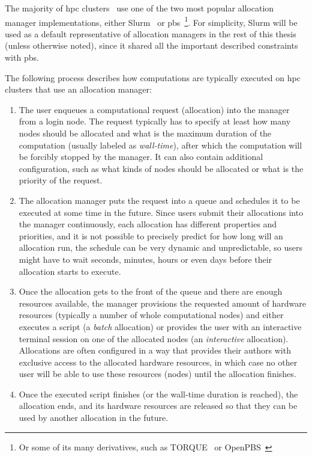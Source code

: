 The majority of \gls{hpc} clusters~\cite{slurm-schedmd} use one of the two
most popular allocation manager implementations, either Slurm~\cite{slurm} or
\gls{pbs}~\cite{pbs}\footnote{Or some of its many derivatives,
such as TORQUE~\cite{torque} or OpenPBS~\cite{openpbs}}. For simplicity,
Slurm will be used as a default representative of allocation managers in the rest of this thesis
(unless otherwise noted), since it shared all the important described constraints with
\gls{pbs}.

The following process describes how computations are typically executed on
\gls{hpc} clusters that use an allocation manager:

\begin{enumerate}
	\item The user enqueues a computational request (allocation) into the manager from a login node. The
	      request typically has to specify at least how many nodes should be allocated and what is the
	      maximum duration of the computation (usually labeled as \emph{wall-time}), after which the
	      computation will be forcibly stopped by the manager. It can also contain additional configuration,
	      such as what kinds of nodes should be allocated or what is the priority of the request.
	\item The allocation manager puts the request into a queue and schedules it to be executed at some time
	      in the future. Since users submit their allocations into the manager continuously, each allocation
	      has different properties and priorities, and it is not possible to precisely predict for how long
	      will an allocation run, the schedule can be very dynamic and unpredictable, so users might have
	  	  to wait seconds, minutes, hours or even days before their allocation starts to execute.
	\item Once the allocation gets to the front of the queue and there are enough resources available, the
	      manager provisions the requested amount of hardware resources (typically a number of whole
	      computational nodes) and either executes a script (a \emph{batch} allocation) or
	      provides the user with an interactive terminal session on one of the allocated nodes (an
	      \emph{interactive} allocation). Allocations are often configured in a way that provides
	      their authors with exclusive access to the allocated hardware resources, in which case no other
	      user will be able to use these resources (nodes) until the allocation finishes.
	\item Once the executed script finishes (or the wall-time duration is reached), the allocation ends, and
	      its hardware resources are released so that they can be used by another allocation in the future.
\end{enumerate}

